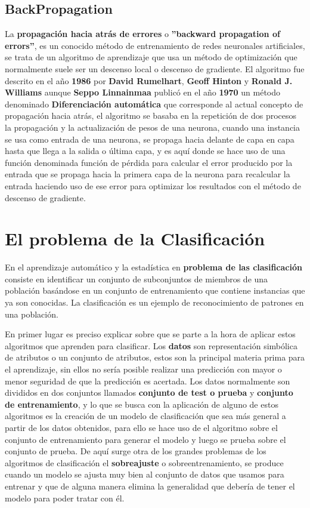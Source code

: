 \documentclass[a4paper, 11pt]{article} %
\begin{document}
\subsection{BackPropagation}
La \textbf{propagación hacia atrás de errores} o \textbf{''backward propagation of errors''}, es un conocido método de entrenamiento de redes neuronales artificiales, se trata de un algoritmo de aprendizaje que usa un método de optimización que normalmente suele ser un descenso local o descenso de gradiente. El algoritmo fue descrito en el año \textbf{1986} por \textbf{David Rumelhart}, \textbf{Geoff Hinton} y \textbf{Ronald J. Williams} aunque \textbf{Seppo Linnainmaa} publicó en el año \textbf{1970} un método denominado \textbf{Diferenciación automática} que corresponde al actual concepto de propagación hacia atrás, el algoritmo se basaba en la repetición de dos procesos la propagación y la actualización de pesos de una neurona, cuando una instancia se usa como entrada de una neurona, se propaga hacia delante de capa en capa hasta que llega a la salida o última capa, y es aquí donde se hace uso de una función denominada función de pérdida para calcular el error producido por la entrada que se propaga hacia la primera capa de la neurona para recalcular la entrada haciendo uso de ese error para optimizar los resultados con el método de descenso de gradiente.

\section{El problema de la Clasificación}
En el aprendizaje automático y la estadística en \textbf{problema de las clasificación} consiste en identificar un conjunto de subconjuntos de miembros de una población basándose en un conjunto de entrenamiento que contiene instancias que ya son conocidas. La clasificación es un ejemplo de reconocimiento de patrones en una población.

En primer lugar es preciso explicar sobre que se parte a la hora de aplicar estos algoritmos que aprenden para clasificar. Los \textbf{datos} son representación simbólica de atributos o un conjunto de atributos, estos son la principal materia prima para el aprendizaje, sin ellos no sería posible realizar una predicción con mayor o menor seguridad de que la predicción es acertada. Los datos normalmente son divididos en dos conjuntos llamados \textbf{conjunto de test o prueba} y \textbf{conjunto de entrenamiento}, y lo que se busca con la aplicación de alguno de estos algoritmos es la creación de un modelo de clasificación que sea más general a partir de los datos obtenidos, para ello se hace uso de el algoritmo sobre el conjunto de entrenamiento para generar el modelo y luego se prueba sobre el conjunto de prueba. De aquí surge otra de los grandes problemas de los algoritmos de clasificación el \textbf{sobreajuste} o sobreentrenamiento, se produce cuando un modelo se ajusta muy bien al conjunto de datos que usamos para entrenar y que de alguna manera elimina la generalidad que debería de tener el modelo para poder tratar con él.
\end{document}
